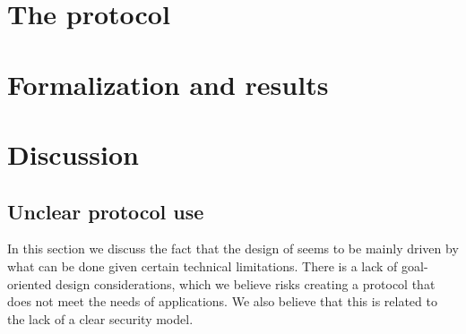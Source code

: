 \documentclass[runningheads,draft,x11names]{llncs}
\begin{document}
\section{The \mEdhoc{} protocol}
\label{sec:edhoc}


\section{Formalization and results}
\label{sec:formalization}


\section{Discussion}
\label{sec:discussion}
\subsection{Unclear protocol use}
\label{sec:unclearProtocolUse}
In this section we discuss the fact that the design of \mEdhoc{} seems to be
mainly driven by what can be done given certain technical limitations.
%
There is a lack of goal-oriented design considerations, which we believe risks
creating a protocol that does not meet the needs of applications.
%
We also believe that this is related to the lack of a clear security model.
%
\end{document}
